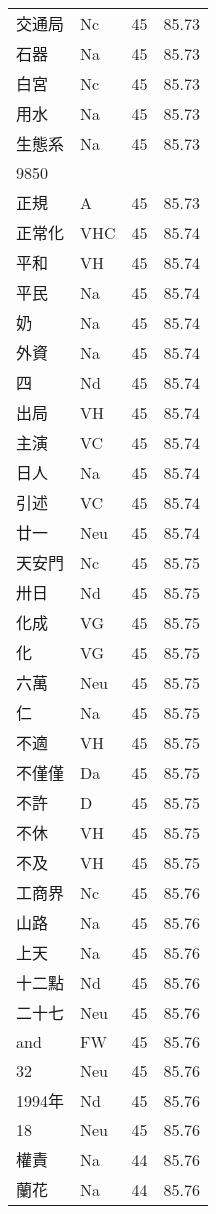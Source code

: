 \documentclass[twocolumn]{book}
\begin{document}
\begin{supertabular}{llrr}
交通局 & Nc & 45 &  85.73\\
石器 & Na & 45 &  85.73\\
白宮 & Nc & 45 &  85.73\\
用水 & Na & 45 &  85.73\\
生態系 & Na & 45 &  85.73\\
9850\\
正規 & A & 45 &  85.73\\
正常化 & VHC & 45 &  85.74\\
平和 & VH & 45 &  85.74\\
平民 & Na & 45 &  85.74\\
奶 & Na & 45 &  85.74\\
外資 & Na & 45 &  85.74\\
四 & Nd & 45 &  85.74\\
出局 & VH & 45 &  85.74\\
主演 & VC & 45 &  85.74\\
日人 & Na & 45 &  85.74\\
引述 & VC & 45 &  85.74\\
廿一 & Neu & 45 &  85.74\\
天安門 & Nc & 45 &  85.75\\
卅日 & Nd & 45 &  85.75\\
化成 & VG & 45 &  85.75\\
化 & VG & 45 &  85.75\\
六萬 & Neu & 45 &  85.75\\
仁 & Na & 45 &  85.75\\
不適 & VH & 45 &  85.75\\
不僅僅 & Da & 45 &  85.75\\
不許 & D & 45 &  85.75\\
不休 & VH & 45 &  85.75\\
不及 & VH & 45 &  85.75\\
工商界 & Nc & 45 &  85.76\\
山路 & Na & 45 &  85.76\\
上天 & Na & 45 &  85.76\\
十二點 & Nd & 45 &  85.76\\
二十七 & Neu & 45 &  85.76\\
and & FW & 45 &  85.76\\
32 & Neu & 45 &  85.76\\
1994年 & Nd & 45 &  85.76\\
18 & Neu & 45 &  85.76\\
權責 & Na & 44 &  85.76\\
蘭花 & Na & 44 &  85.76\\

\end{supertabular}
\end{document}
